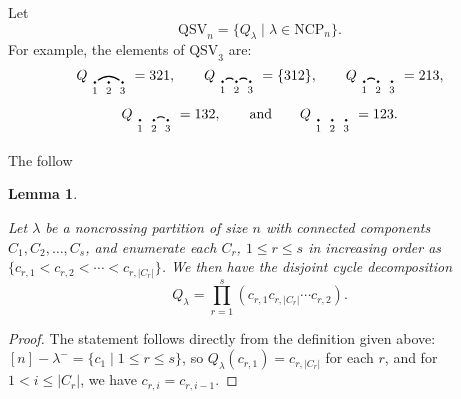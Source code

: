 \documentclass[12pt]{article}
\newtheorem{lem}[equation]{Lemma}
\theoremstyle{definition}
\theoremstyle{remark}
\numberwithin{equation}{section}
\renewcommand{\setminus}{-}
\newcommand{\QSV}{\mathrm{QSV}}
\newcommand{\NCP}{\mathrm{NCP}}
\begin{document}
Let
\[
\QSV_{n} = \{Q_{\lambda} \;|\; \lambda \in \NCP_{n} \}.
\]
For example, the elements of $\QSV_{3}$ are:
\[
Q_{\begin{tikzpicture}[scale = 0.35, baseline = 0.35*-0.2]
\foreach \x in {1, ..., 3}{\draw[fill] (\x - 1, 0) circle (2pt) node[inner sep = 2pt] (\x) {};}
\foreach \x in {1, ..., 3}{\node[below] at (\x) {$\scriptstyle \x$};}
\foreach \i\j in {1/3}{\draw[thick] (\i) to[out = 35, in = 145] (\j);}
\end{tikzpicture}} = 321, \qquad
Q_{\begin{tikzpicture}[scale = 0.35, baseline = 0.35*-0.2]
\foreach \x in {1, ..., 3}{\draw[fill] (\x - 1, 0) circle (2pt) node[inner sep = 2pt] (\x) {};}
\foreach \x in {1, ..., 3}{\node[below] at (\x) {$\scriptstyle \x$};}
\foreach \i\j in {1/2, 2/3}{\draw[thick] (\i) to[out = 35, in = 145] (\j);}
\end{tikzpicture}} = \{312\}, \qquad
Q_{\begin{tikzpicture}[scale = 0.35, baseline = 0.35*-0.2]
\foreach \x in {1, ..., 3}{\draw[fill] (\x - 1, 0) circle (2pt) node[inner sep = 2pt] (\x) {};}
\foreach \x in {1, ..., 3}{\node[below] at (\x) {$\scriptstyle \x$};}
\foreach \i\j in {1/2}{\draw[thick] (\i) to[out = 35, in = 145] (\j);}
\end{tikzpicture}} = 213, 
\]
\[
Q_{\begin{tikzpicture}[scale = 0.35, baseline = 0.35*-0.2]
\foreach \x in {1, ..., 3}{\draw[fill] (\x - 1, 0) circle (2pt) node[inner sep = 2pt] (\x) {};}
\foreach \x in {1, ..., 3}{\node[below] at (\x) {$\scriptstyle \x$};}
\foreach \i\j in {2/3}{\draw[thick] (\i) to[out = 35, in = 145] (\j);}
\end{tikzpicture}} = 132, \qquad\text{and}\qquad
Q_{\begin{tikzpicture}[scale = 0.35, baseline = 0.35*-0.2]
\foreach \x in {1, ..., 3}{\draw[fill] (\x - 1, 0) circle (2pt) node[inner sep = 2pt] (\x) {};}
\foreach \x in {1, ..., 3}{\node[below] at (\x) {$\scriptstyle \x$};}
\end{tikzpicture}} = 123.
\]

The follow

\begin{lem}
\label{lem:QSVcycles}

Let $\lambda$ be a noncrossing partition of size $n$ with connected components $C_{1}, C_{2}, \ldots, C_{s}$, and enumerate each $C_{r}$, $1 \le r \le s$ in increasing order as $\{c_{r, 1} < c_{r, 2} < \cdots < c_{r, |C_{r}|}\}$. 
We then have the disjoint cycle decomposition
\[
Q_{\lambda} = \prod_{r = 1}^{s} (c_{r, 1} c_{r, |C_{r}|} \cdots c_{r, 2}).
\]
\end{lem}
\begin{proof}
The statement follows directly from the definition given above: $[n] \setminus \lambda^{-} = \{c_1 \;|\; 1 \le r \le s\}$, so $Q_{\lambda}(c_{r, 1}) =  c_{r, |C_{r}|}$ for each $r$, and for $1 < i \le |C_{r}|$, we have $c_{r, i} = c_{r, i-1}$.
\end{proof}
\end{document}
